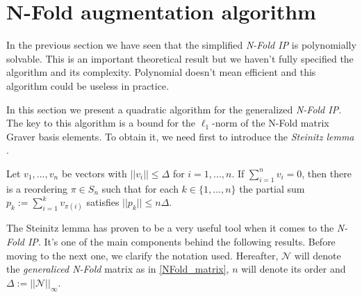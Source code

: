\section{N-Fold augmentation algorithm}

In the previous section we have seen that the simplified \emph{N-Fold IP} is polynomially solvable. This is an important theoretical result but we haven't fully specified the algorithm and its complexity. Polynomial doesn't mean efficient and this algorithm could be useless in practice.

In this section we present a quadratic algorithm for the generalized \emph{N-Fold IP}. The key to this algorithm is a bound for the $\ell_1$-norm of the N-Fold matrix Graver basis elements. To obtain it, we need first to introduce the \textit{Steinitz lemma} \cite{STEINITZ:1913}.

\begin{lemma}
    Let $v_1,...,v_n$ be vectors with $||v_i|| \leq \Delta$ for $i = 1,...,n$. If $\sum_{i=1}^{n} v_i = 0$, then there is a reordering $\pi \in S_n$ such that for each $k \in \{1,...,n\}$ the partial sum $p_k := \sum_{i=1}^{k}v_{\pi(i)}$ satisfies $||p_k|| \leq n\Delta$.
\end{lemma}

The Steinitz lemma has proven to be a very useful tool when it comes to the \emph{N-Fold IP}. It's one of the main components behind the following results. Before moving to the next one, we clarify the notation used. Hereafter, $\mathcal{N}$ will denote the \emph{generaliced N-Fold} matrix as in \ref{NFold_matrix}, $n$ will denote its order and $\Delta := ||\mathcal{N}||_\infty$. 

